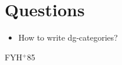 \documentclass{compositio}
\theoremstyle{definition}
\numberwithin{equation}{section}
\begin{document}
\section{Questions}

\begin{itemize}
\item How to write dg-categories?
\end{itemize}

\newcommand{\etalchar}[1]{$^{#1}$}
\providecommand{\href}[2]{#2}
\begin{thebibliography}{FYH{\etalchar{+}}85}

%
%
%
%
%
%
%


\end{thebibliography}
\end{document}
